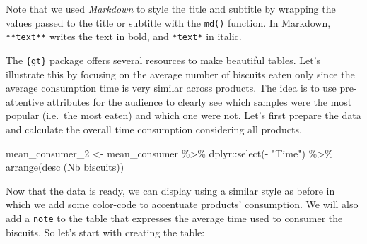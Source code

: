 \documentclass[
]{krantz}
\makeatletter
\newenvironment{Shaded}{\begin{snugshade}}{\end{snugshade}}
\newcommand{\AttributeTok}[1]{\textcolor[rgb]{0.61,0.61,0.61}{#1}}
\newcommand{\FunctionTok}[1]{\textcolor[rgb]{0,0,0}{#1}}
\newcommand{\NormalTok}[1]{#1}
\newcommand{\OtherTok}[1]{\textcolor[rgb]{0.37,0.37,0.37}{#1}}
\newcommand{\SpecialCharTok}[1]{\textcolor[rgb]{0,0,0}{#1}}
\newcommand{\StringTok}[1]{\textcolor[rgb]{0.5,0.5,0.5}{#1}}
\newenvironment{kframe}{%
\medskip{}
\setlength{\fboxsep}{.8em}
 \def\at@end@of@kframe{}%
 \ifinner\ifhmode%
  \def\at@end@of@kframe{\end{minipage}}%
  \begin{minipage}{\columnwidth}%
 \fi\fi%
 \def\FrameCommand##1{\hskip\@totalleftmargin \hskip-\fboxsep
 \colorbox{shadecolor}{##1}\hskip-\fboxsep
     \hskip-\linewidth \hskip-\@totalleftmargin \hskip\columnwidth}%
 \MakeFramed {\advance\hsize-\width
   \@totalleftmargin\z@ \linewidth\hsize
   \@setminipage}}%
 {\par\unskip\endMakeFramed%
 \at@end@of@kframe}
\renewenvironment{Shaded}{\begin{kframe}}{\end{kframe}}
\makeatother
\begin{document}
Note that we used \emph{Markdown} to style the title and subtitle by wrapping the values passed to the title or subtitle with the \texttt{md()} function. In Markdown, \texttt{**text**} writes the text in bold, and \texttt{*text*} in italic.

The \texttt{\{gt\}} package offers several resources to make beautiful tables. Let's illustrate this by focusing on the average number of biscuits eaten only since the average consumption time is very similar across products. The idea is to use pre-attentive attributes for the audience to clearly see which samples were the most popular (i.e.~the most eaten) and which one were not. Let's first prepare the data and calculate the overall time consumption considering all products.

\begin{Shaded}
\begin{Highlighting}[]
\NormalTok{mean\_consumer\_2 }\OtherTok{\textless{}{-}}\NormalTok{ mean\_consumer }\SpecialCharTok{\%\textgreater{}\%}
\NormalTok{  dplyr}\SpecialCharTok{::}\FunctionTok{select}\NormalTok{(}\SpecialCharTok{{-}} \StringTok{"Time"}\NormalTok{) }\SpecialCharTok{\%\textgreater{}\%}
  \FunctionTok{arrange}\NormalTok{(}\FunctionTok{desc}\NormalTok{ (}\StringTok{\textasciigrave{}}\AttributeTok{Nb biscuits}\StringTok{\textasciigrave{}}\NormalTok{))}
\end{Highlighting}
\end{Shaded}

Now that the data is ready, we can display using a similar style as before in which we add some color-code to accentuate products' consumption. We will also add a \texttt{note} to the table that expresses the average time used to consumer the biscuits. So let's start with creating the table:
\end{document}
